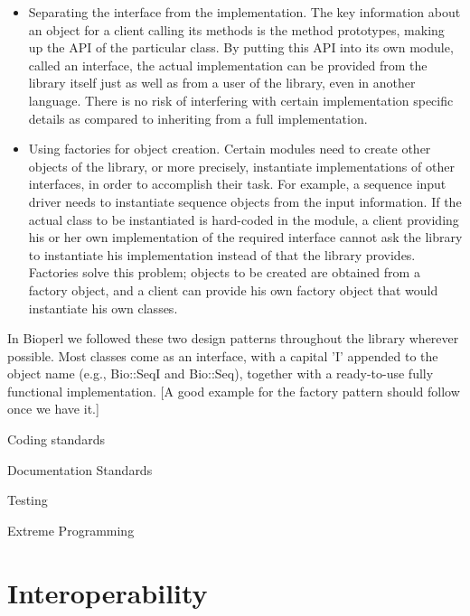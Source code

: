 \documentclass[twocolumn]{article}
\begin{document}
\begin{itemize}

\item Separating the interface from the implementation.  The key
information about an object for a client calling its methods is the
method prototypes, making up the API of the particular class.  By
putting this API into its own module, called an interface, the actual
implementation can be provided from the library itself just as well as
from a user of the library, even in another language.  There is no risk
of interfering with certain implementation specific details as
compared to inheriting from a full implementation.


\item Using factories for object creation.  Certain modules need to
create other objects of the library, or more precisely, instantiate
implementations of other interfaces, in order to accomplish their
task.  For example, a sequence input driver needs to instantiate
sequence objects from the input information.  If the actual class to be
instantiated is hard-coded in the module, a client providing his or
her own implementation of the required interface cannot ask the
library to instantiate his implementation instead of that the library
provides.  Factories solve this problem; objects to be created are
obtained from a factory object, and a client can provide his own
factory object that would instantiate his own classes.

\end{itemize}

In Bioperl we followed these two design patterns \cite{gangoffour}
throughout the library wherever possible.  Most classes come as an
interface, with a capital 'I' appended to the object name (e.g.,
Bio::SeqI and Bio::Seq), together with a ready-to-use fully functional
implementation.  [A good example for the factory pattern should follow
once we have it.]


Coding standards

Documentation Standards

Testing

Extreme Programming\cite{xprogramming}


\section{Interoperability}

\end{document}
